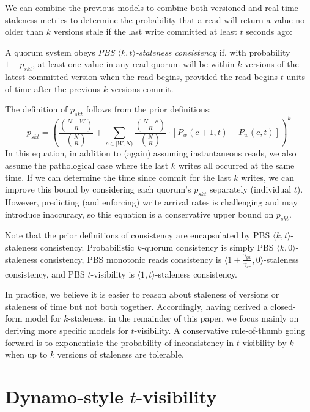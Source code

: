 \documentclass{vldb}
\newcommand{\sectionskip}{-0em}
\begin{document}
We can combine the previous models to combine both versioned and
real-time staleness metrics to determine the probability that a read
will return a value no older than $k$ versions stale if the last write
committed at least $t$ seconds ago:
\begin{definition}
A quorum system obeys \textit{PBS $\langle k, t \rangle$-staleness
  consistency} if, with probability $1-p_{skt}$, at least one value in
any read quorum will be within $k$ versions of the latest committed
version when the read begins, provided the read begins $t$ units of
time after the previous $k$ versions commit.
\end{definition}
The definition of $p_{skt}$ follows from the prior definitions:
\begin{equation}
p_{skt} = (\frac{{N-W \choose R}}{{N \choose R}}+\sum_{c\in[W, N)} \frac{{N-c \choose R}}{{N \choose R}} \cdot [P_w(c+1, t)-P_w(c,t)])^k
\end{equation}
In this equation, in addition to (again) assuming instantaneous reads,
we also assume the pathological case where the last $k$ writes all
occurred at the same time.  If we can determine the time since commit
for the last $k$ writes, we can improve this bound by considering each
quorum's $p_{skt}$ separately (individual $t$).  However, predicting
(and enforcing) write arrival rates is challenging and may introduce
inaccuracy, so this equation is a conservative upper bound on
$p_{skt}$.

Note that the prior definitions of consistency are encapsulated by PBS
$\langle k, t \rangle$-staleness consistency. Probabilistic $k$-quorum
consistency is simply PBS $\langle k, 0 \rangle$-staleness consistency,
PBS monotonic reads consistency is $\langle
1+\frac{\gamma_{gw}}{\gamma_{cr}}, 0 \rangle$-staleness consistency, and
PBS $t$-visibility is $\langle 1, t \rangle$-staleness consistency.

In practice, we believe it is easier to reason about staleness of
versions or staleness of time but not both together.  Accordingly,
having derived a closed-form model for $k$-staleness, in the remainder
of this paper, we focus mainly on deriving more specific models for
$t$-visibility. A conservative rule-of-thumb going forward is to
exponentiate the probability of inconsistency in $t$-visibility by $k$
when up to $k$ versions of staleness are tolerable.

\vspace{\sectionskip}\section{Dynamo-style $t$-visibility}
\label{sec:dynamo}
\end{document}
